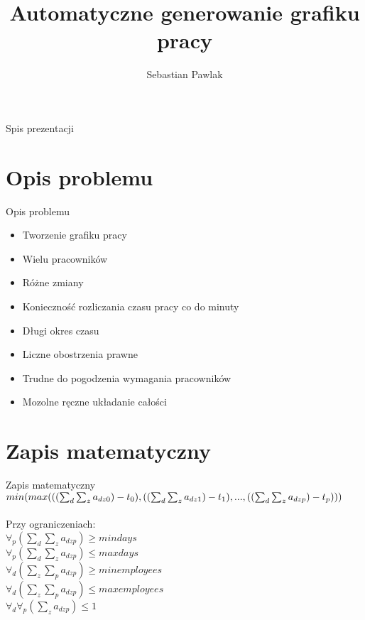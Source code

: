 \documentclass{beamer}
\title{Automatyczne generowanie grafiku pracy}
\author{Sebastian Pawlak}
\institute[Politechnika Poznańska]
{
  Informatyka w Medycynie\\
  Wydział Informatyki Politechniki Poznańskiej
 }
\begin{document}
\begin{frame}
  \titlepage
\end{frame}

\begin{frame}{Spis prezentacji}
  \tableofcontents
\end{frame}

\section{Opis problemu}

\begin{frame}{Opis problemu}
  \begin{itemize}
  \item{Tworzenie grafiku pracy}
  \item{Wielu pracowników}
  \item{Różne zmiany}
  \item{Konieczność rozliczania czasu pracy co do minuty}
  \item{Długi okres czasu}
  \item{Liczne obostrzenia prawne}
  \item{Trudne do pogodzenia wymagania pracowników}
  \item{Mozolne ręczne układanie całości}
  \end{itemize}
\end{frame}

\section{Zapis matematyczny}

\begin{frame}{Zapis matematyczny}
  \begin{math} 
  min(max(((\sum_{d}^{ }\sum_{z}^{ }a_{dz0})-t_{0}),\\((\sum_{d}^{ }\sum_{z}^{ }a_{dz1})-t_{1}), ... , ((\sum_{d}^{ }\sum_{z}^{ }a_{dzp})-t_{p})))
  \end{math}
  \\ \\Przy ograniczeniach:\\
  \begin{math} 
  \forall_{p}(\sum_{d}^{ }\sum_{z}^{ }a_{dzp})\geqslant mindays
  \end{math}
  \\
  \begin{math} 
  \forall_{p}(\sum_{d}^{ }\sum_{z}^{ }a_{dzp})\leqslant maxdays
  \end{math}
  \\
  \begin{math} 
  \forall_{d}(\sum_{z}^{ }\sum_{p}^{ }a_{dzp})\geqslant minemployees
  \end{math}
  \\
  \begin{math} 
  \forall_{d}(\sum_{z}^{ }\sum_{p}^{ }a_{dzp})\leqslant maxemployees
  \end{math}
  \\
  \begin{math} 
  \forall_{d}\forall_{p}(\sum_{z}^{ }a_{dzp})\leqslant 1
  \end{math}
\end{frame}
\end{document}
